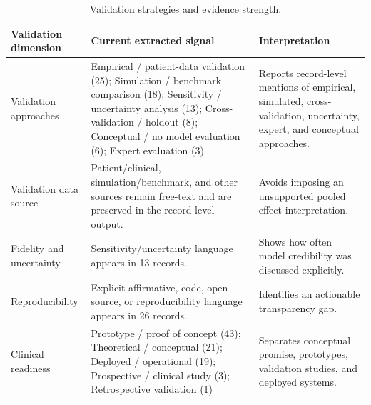 \begin{table}[htbp]
\centering
\small
\caption{Validation strategies and evidence strength.}
\label{tab:validation}
\begin{tabularx}{\textwidth}{@{}>{\raggedright\arraybackslash}p{}YY@{}}
\toprule
\textbf{Validation dimension} & \textbf{Current extracted signal} & \textbf{Interpretation} \\
\midrule
Validation approaches & Empirical / patient-data validation (25); Simulation / benchmark comparison (18); Sensitivity / uncertainty analysis (13); Cross-validation / holdout (8); Conceptual / no model evaluation (6); Expert evaluation (3) & Reports record-level mentions of empirical, simulated, cross-validation, uncertainty, expert, and conceptual approaches. \\
Validation data source & Patient/clinical, simulation/benchmark, and other sources remain free-text and are preserved in the record-level output. & Avoids imposing an unsupported pooled effect interpretation. \\
Fidelity and uncertainty & Sensitivity/uncertainty language appears in 13 records. & Shows how often model credibility was discussed explicitly. \\
Reproducibility & Explicit affirmative, code, open-source, or reproducibility language appears in 26 records. & Identifies an actionable transparency gap. \\
Clinical readiness & Prototype / proof of concept (43); Theoretical / conceptual (21); Deployed / operational (19); Prospective / clinical study (3); Retrospective validation (1) & Separates conceptual promise, prototypes, validation studies, and deployed systems. \\
\bottomrule
\end{tabularx}
\end{table}
